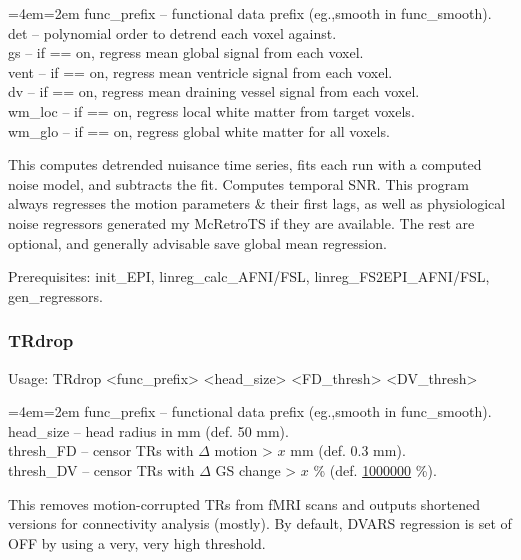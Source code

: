 \documentclass[final,titlepage,letterpaper,oneside,12pt]{article}
\renewcommand{\texttt}[2][BrickRed]{\textcolor{#1}{\ttfamily #2}}%
\newenvironment{blockquote}{%
  \par%
  \medskip
  \leftskip=4em\rightskip=2em%
  \noindent\ignorespaces}{%
  \par\medskip}
\begin{document}
\begin{blockquote}
func\_prefix -- functional data prefix (eg.,smooth in func\_smooth). \\
det -- polynomial order to detrend each voxel against. \\
gs -- if == on, regress mean global signal from each voxel. \\
vent -- if == on, regress mean ventricle signal from each voxel. \\
dv -- if == on, regress mean draining vessel signal from each voxel. \\
wm\_loc -- if == on, regress local white matter from target voxels. \\
wm\_glo -- if == on, regress global white matter for all voxels. \

\end{blockquote}

\noindent This computes detrended nuisance time series, fits each run with a computed noise model, and subtracts the fit. Computes temporal SNR. This program always regresses the motion parameters \& their first lags, as well as physiological noise regressors generated my McRetroTS if they are available. The rest are optional, and generally advisable save global mean regression.

Prerequisites: \texttt{init\_EPI}, \texttt{linreg\_calc\_AFNI/FSL}, \texttt{linreg\_FS2EPI\_AFNI/FSL}, \texttt{gen\_regressors}.

\subsubsection{TRdrop}
Usage: \texttt{TRdrop <func\_prefix> <head\_size> <FD\_thresh> <DV\_thresh>}

\begin{blockquote}
func\_prefix -- functional data prefix (eg.,smooth in func\_smooth). \\
head\_size -- head radius in mm (def. 50 mm). \\
thresh\_FD -- censor TRs with $\Delta$ motion > $x$ mm (def. 0.3 mm). \\
thresh\_DV -- censor TRs with $\Delta$ GS change > $x$ \% (def. \href{http://upload.wikimedia.org/wikipedia/en/1/16/Drevil_million_dollars.jpg}{1000000} \%). \
\end{blockquote}

\noindent This removes motion-corrupted TRs from fMRI scans and outputs shortened versions for connectivity analysis (mostly). By default, DVARS regression is set of OFF by using a very, very high threshold.
\end{document}
